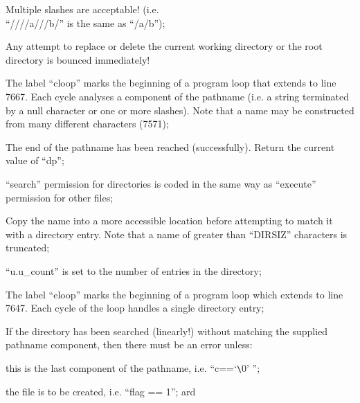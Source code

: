\item[7535:] Multiple slashes are  acceptable! (i.e.\\
 ``////a///b/'' is the same as ``/a/b'');

\item[7537:] Any attempt to replace or  delete
      the  current working directory or
      the  root  directory  is  bounced
      immediately!

\item[7542:] The  label  ``cloop''   marks   the
      beginning  of a program loop that
      extends to line 7667.  Each cycle
      analyses a component of the pathname (i.e. a string terminated by
      a  null  character or one or more
      slashes).  Note that a  name  may
      be  constructed  from  many  different characters (7571);

\item[7550:] The end of the pathname has  been
      reached  (successfully).   Return
      the current value of ``dp'';

\item[7563:] ``search''  permission  for  directories  is  coded in the same way
      as ``execute'' permission for other files;

\item[7570:] Copy the name into a more  accessible  location before attempting
      to  match  it  with  a  directory
      entry.    Note  that  a  name  of
      greater than ``DIRSIZ''  characters
      is truncated;

\item[7589:] ``u.u\_count'' is set to the  number
      of entries in the directory;

\item[7592:] The  label  ``eloop''   marks   the
      beginning of a program loop which
      extends to line 7647. Each cycle
      of the loop handles a single
      directory entry;

\item[7600:] If the directory has been
      searched (linearly!) without
      matching the supplied pathname
      component, then there must be an
      error unless:

\bd
     \item[(a)] this is the last component of
      the pathname, i.e. ``c==`\verb+\+0' '';

      \item[(b)] the file is to be created,
      i.e. ``flag == 1''; ard

